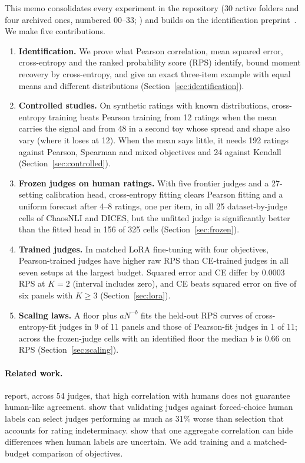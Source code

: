 This memo consolidates every experiment in the repository (30 active folders and four archived ones, numbered 00--33; ) and builds on the identification preprint~\citep{miranda2026correlation}.
We make five contributions.
\begin{enumerate}
\item \textbf{Identification.} We prove what Pearson correlation, mean squared error, cross-entropy and the ranked probability score (RPS) identify, bound moment recovery by cross-entropy, and give an exact three-item example with equal means and different distributions (Section~\ref{sec:identification}).
\item \textbf{Controlled studies.} On synthetic ratings with known distributions, cross-entropy training beats Pearson training from 12 ratings when the mean carries the signal and from 48 in a second toy whose spread and shape also vary (where it loses at 12).
When the mean says little, it needs 192 ratings against Pearson, Spearman and mixed objectives and 24 against Kendall (Section~\ref{sec:controlled}).
\item \textbf{Frozen judges on human ratings.} With five frontier judges and a 27-setting calibration head, cross-entropy fitting clears Pearson fitting and a uniform forecast after 4--8 ratings, one per item, in all 25 dataset-by-judge cells of ChaosNLI and DICES, but the unfitted judge is significantly better than the fitted head in 156 of 325 cells (Section~\ref{sec:frozen}).
\item \textbf{Trained judges.} In matched LoRA fine-tuning with four objectives, Pearson-trained judges have higher raw RPS than CE-trained judges in all seven setups at the largest budget.
Squared error and CE differ by $0.0003$ RPS at $K=2$ (interval includes zero), and CE beats squared error on five of six panels with $K\ge3$ (Section~\ref{sec:lora}).
\item \textbf{Scaling laws.} A floor plus $aN^{-b}$ fits the held-out RPS curves of cross-entropy-fit judges in 9 of 11 panels and those of Pearson-fit judges in 1 of 11; across the frozen-judge cells with an identified floor the median $b$ is $0.66$ on RPS (Section~\ref{sec:scaling}).
\end{enumerate}

\paragraph{Related work.}
\citet{han2025judgesverdict} report, across 54 judges, that high correlation with humans does not guarantee human-like agreement.
\citet{guerdan2025validating} show that validating judges against forced-choice human labels can select judges performing as much as 31\% worse than selection that accounts for rating indeterminacy.
\citet{elangovan2025beyond} show that one aggregate correlation can hide differences when human labels are uncertain.
We add training and a matched-budget comparison of objectives.
